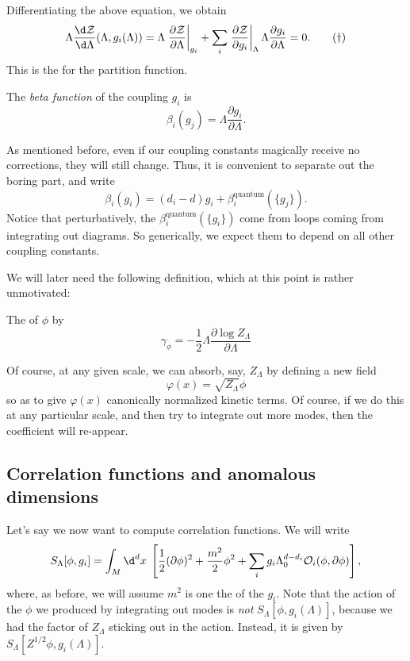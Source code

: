 \documentclass[a4paper]{article}
\begin{document}
Differentiating the above equation, we obtain
\[
  \Lambda \frac{\d \mathcal{Z}}{\d \Lambda} (\Lambda, g_i(\Lambda)) = \Lambda \left.\frac{\partial \mathcal{Z}}{\partial \Lambda}\right|_{g_i} + \sum_i \left.\frac{\partial \mathcal{Z}}{\partial g_i}\right|_{\Lambda} \Lambda \frac{\partial g_i}{\partial \Lambda} = 0. \tag{$\dagger$}
\]
This is the  for the partition function.

\begin{defi}
  The \emph{beta function} of the coupling $g_i$ is
  \[
    \beta_i (g_j) = \Lambda \frac{\partial g_i}{\partial \Lambda}.
  \]
\end{defi}

As mentioned before, even if our coupling constants magically receive no corrections, they will still change. Thus, it is convenient to separate out the boring part, and write
\[
  \beta_i(g_i) = (d_i - d) g_i + \beta_i^{\mathrm{quantum}} (\{g_j\}).
\]
Notice that perturbatively, the $\beta_i^{\mathrm{quantum}} (\{g_i\})$ come from loops coming from integrating out diagrams. So generically, we expect them to depend on all other coupling constants.

We will later need the following definition, which at this point is rather unmotivated:
\begin{defi}
  The  of $\phi$ by
  \[
    \gamma_\phi = - \frac{1}{2} \Lambda \frac{\partial \log Z_\Lambda}{\partial \Lambda}
  \]
\end{defi}

Of course, at any given scale, we can absorb, say, $Z_\Lambda$ by defining a new field
\[
  \varphi(x) = \sqrt{Z_\Lambda} \phi
\]
so as to give $\varphi(x)$ canonically normalized kinetic terms. Of course, if we do this at any particular scale, and then try to integrate out more modes, then the coefficient will re-appear.

\subsection{Correlation functions and anomalous dimensions}
Let's say we now want to compute correlation functions. We will write
\[
  S_\Lambda[\phi, g_i] = \int_M \d^d x\; \left[\frac{1}{2}(\partial \phi)^2 + \frac{m^2}{2} \phi^2 + \sum_i g_i \Lambda^{d - d_i}_0 \mathcal{O}_i(\phi , \partial\phi)\right],
\]
where, as before, we will assume $m^2$ is one the of the $g_i$. Note that the action of the $\phi$ we produced by integrating out modes is \emph{not} $S_\Lambda[\phi, g_i(\Lambda)]$, because we had the factor of $Z_\Lambda$ sticking out in the action. Instead, it is given by $S_\Lambda[Z^{1/2} \phi, g_i(\Lambda)]$.
\end{document}
